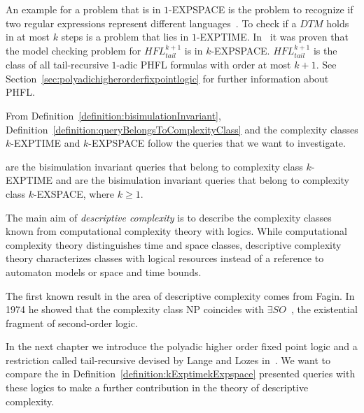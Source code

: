 An example for a problem that is in $1$-EXPSPACE is the problem to recognize
if two regular expressions represent different languages~\cite{meyer1972equivalence}. To check if a $\mathit{DTM}$
holds in at most $k$ steps is a problem that lies in $1$-EXPTIME. In~\cite{bruse2017space} it was proven that the
model checking problem for $\mathit{HFL}^{k + 1}_{tail}$ is in $k$-EXPSPACE. $\mathit{HFL}^{k + 1}_{tail}$ is the
class of all tail-recursive $1$-adic PHFL formulas with order at most $k + 1$. See
Section~\ref{sec:polyadichigherorderfixpointlogic} for further information about PHFL.

From Definition~\ref{definition:bisimulationInvariant}, Definition~\ref{definition:queryBelongsToComplexityClass}
and the complexity classes $k$-EXPTIME and $k$-EXPSPACE follow the queries that we want to investigate.

\begin{definition}
    \label{definition:kExptimekExpspace}
     are the bisimulation invariant queries that belong to complexity class $k$-EXPTIME and
     are the bisimulation invariant queries that belong to complexity class $k$-EXSPACE, where $k \geq 1$.
\end{definition}

The main aim of \emph{descriptive complexity} is to describe the complexity classes known from
computational complexity theory with logics. While computational complexity theory distinguishes time and space
classes, descriptive complexity theory characterizes classes with logical resources instead of a reference to
automaton models or space and time bounds.

The first known result in the area of descriptive complexity comes from Fagin. In 1974 he showed that the complexity
class NP coincides with $\exists SO$~\cite{fagin1974generalized}, the existential fragment of second-order logic.

In the next chapter we introduce the polyadic higher order fixed point logic and a restriction called tail-recursive
devised by Lange and Lozes in~\cite{lange2014capturing}. We want to compare the in
Definition~\ref{definition:kExptimekExpspace} presented queries with these logics to make a further contribution in
the theory of descriptive complexity.